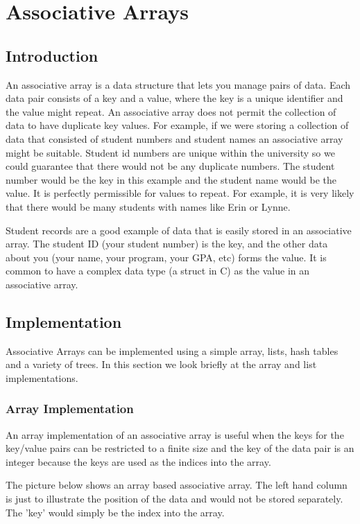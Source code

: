\chapter{Associative Arrays} \label{associative}
\section{Introduction}

An associative array is a data structure that lets you manage pairs of data.   Each data pair consists of a key and a value,  where the key is a unique identifier and the value might repeat.  An associative array does not permit the collection of data to have duplicate key values.   For example, if we were storing a collection of data that consisted of student numbers and student names an associative array might be suitable.   Student id numbers are unique within the university so we could guarantee that there would not be any duplicate numbers.  The student number would be the key in this example and the student name would be the value.  It is perfectly permissible for values to repeat.  For example, it is very likely that there would be many students with names like Erin or Lynne.


Student records are a good example of data that is easily stored in an associative array. The student ID (your student number) is the key, and the other data about you (your name, your program, your GPA, etc) forms the value. It is common to have a complex data type (a struct in C) as the value in an associative array.

\section{Implementation}
Associative Arrays can be implemented using a simple array, lists, hash tables and a variety of trees. In this section we look briefly at the array and list implementations. 


\subsection{Array Implementation}

An array implementation of an associative array is useful when the keys for the key/value pairs can be restricted to a finite size and the key of the data pair is  an integer because the keys are used as the indices into the array.         

The picture below shows an array based associative array. The left hand column is just to illustrate the position of the data and would not be stored separately. The 'key' would simply be the index into the array.



